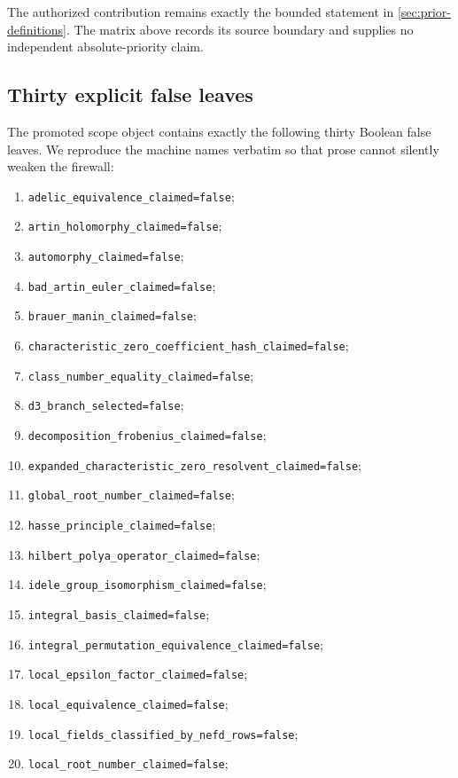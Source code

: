 The authorized contribution remains exactly the bounded statement in
\cref{sec:prior-definitions}.  The matrix above records its source boundary
and supplies no independent absolute-priority claim.

\subsection{Thirty explicit false leaves}

The promoted scope object contains exactly the following thirty Boolean
false leaves.  We reproduce the machine names verbatim so that prose cannot
silently weaken the firewall:
\begin{enumerate}[label=\texttt{F\arabic*.},leftmargin=3.5em]
\item \texttt{adelic\_equivalence\_claimed=false};
\item \texttt{artin\_holomorphy\_claimed=false};
\item \texttt{automorphy\_claimed=false};
\item \texttt{bad\_artin\_euler\_claimed=false};
\item \texttt{brauer\_manin\_claimed=false};
\item \texttt{characteristic\_zero\_coefficient\_hash\_claimed=false};
\item \texttt{class\_number\_equality\_claimed=false};
\item \texttt{d3\_branch\_selected=false};
\item \texttt{decomposition\_frobenius\_claimed=false};
\item \texttt{expanded\_characteristic\_zero\_resolvent\_claimed=false};
\item \texttt{global\_root\_number\_claimed=false};
\item \texttt{hasse\_principle\_claimed=false};
\item \texttt{hilbert\_polya\_operator\_claimed=false};
\item \texttt{idele\_group\_isomorphism\_claimed=false};
\item \texttt{integral\_basis\_claimed=false};
\item \texttt{integral\_permutation\_equivalence\_claimed=false};
\item \texttt{local\_epsilon\_factor\_claimed=false};
\item \texttt{local\_equivalence\_claimed=false};
\item \texttt{local\_fields\_classified\_by\_nefd\_rows=false};
\item \texttt{local\_root\_number\_claimed=false};

\end{enumerate}
